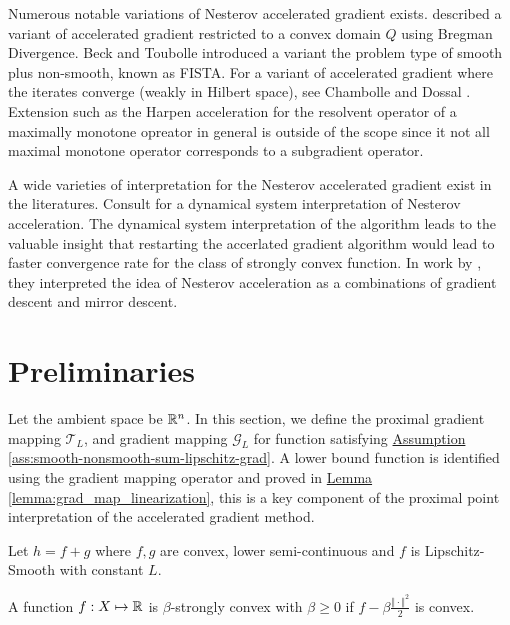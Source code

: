 \documentclass[12pt]{article}
\begin{document}
    \par
    Numerous notable variations of Nesterov accelerated gradient exists. \cite[(6.1.19)]{nesterov_lectures_2018} described a variant of accelerated gradient restricted to a convex domain $Q$ using Bregman Divergence. 
    Beck and Toubolle \cite{beck_fast_2009} introduced a variant the problem type of smooth plus non-smooth, known as FISTA. 
    For a variant of accelerated gradient where the iterates converge (weakly in Hilbert space), see Chambolle and Dossal \cite{chambolle_convergence_2015}. 
    Extension such as the Harpen acceleration for the resolvent operator of a maximally monotone opreator in general is outside of the scope since it not all maximal monotone operator corresponds to a subgradient operator. 
    \par
    A wide varieties of interpretation for the Nesterov accelerated gradient exist in the literatures. 
    Consult \cite{su_differential_2015} for a dynamical system interpretation of Nesterov acceleration. 
    The dynamical system interpretation of the algorithm leads to the valuable insight that restarting the accerlated gradient algorithm would lead to faster convergence rate for the class of strongly convex function. 
    In work by \cite{allen-zhu_linear_2016}, they interpreted the idea of Nesterov acceleration as a combinations of gradient descent and mirror descent. 

    
\section{Preliminaries}\label{sec:preliminaries}
    Let the ambient space be $\mathbb R^n$. 
    In this section, we define the proximal gradient mapping $\mathcal T_L$, and gradient mapping $\mathcal G_L$ for function satisfying 
    \hyperref[ass:smooth-nonsmooth-sum-lipschitz-grad]
    {Assumption \ref*{ass:smooth-nonsmooth-sum-lipschitz-grad}}. 
    A lower bound function is identified using the gradient mapping operator and proved in
    \hyperref[lemma:grad_map_linearization]{Lemma \ref*{lemma:grad_map_linearization}}, 
    this is a key component of the proximal point interpretation of the accelerated gradient method. 
    \begin{assumption}\label{ass:smooth-nonsmooth-sum-lipschitz-grad}
        Let $h = f + g$ where $f, g$ are convex, lower semi-continuous and $f$ is Lipschitz-Smooth with constant $L$. 
    \end{assumption}
    \begin{definition}
        A function $f: X \mapsto \mathbb R$ is $\beta$-strongly convex
        with $\beta\geq 0$ if $f - \beta \frac{\Vert \cdot\Vert^2}{2}$ is convex.
    \end{definition}
\end{document}
